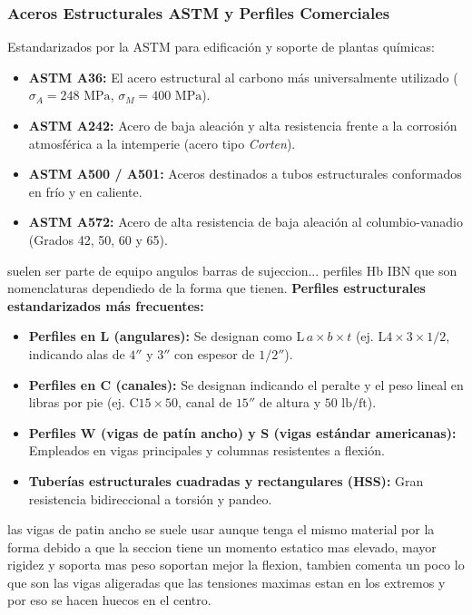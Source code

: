 \subsubsection{Aceros Estructurales ASTM y Perfiles Comerciales}
Estandarizados por la ASTM para edificación y soporte de plantas químicas:
\begin{itemize}
    \item \textbf{ASTM A36:} El acero estructural al carbono más universalmente utilizado ($\sigma_A = 248\text{ MPa}$, $\sigma_M = 400\text{ MPa}$).
    \item \textbf{ASTM A242:} Acero de baja aleación y alta resistencia frente a la corrosión atmosférica a la intemperie (acero tipo \textit{Corten}).
    \item \textbf{ASTM A500 / A501:} Aceros destinados a tubos estructurales conformados en frío y en caliente.
    \item \textbf{ASTM A572:} Acero de alta resistencia de baja aleación al columbio-vanadio (Grados 42, 50, 60 y 65).
\end{itemize}
suelen ser parte de equipo angulos barras de sujeccion...  perfiles Hb IBN que son nomenclaturas dependiedo de la forma que tienen.
\textbf{Perfiles estructurales estandarizados más frecuentes:}
\begin{itemize}
    \item \textbf{Perfiles en L (angulares):} Se designan como $\text{L} \, a \times b \times t$ (ej. $\text{L}4 \times 3 \times 1/2$, indicando alas de $4''$ y $3''$ con espesor de $1/2''$).
    \item \textbf{Perfiles en C (canales):} Se designan indicando el peralte y el peso lineal en libras por pie (ej. $\text{C}15 \times 50$, canal de $15''$ de altura y $50\text{ lb/ft}$).
    \item \textbf{Perfiles W (vigas de patín ancho) y S (vigas estándar americanas):} Empleados en vigas principales y columnas resistentes a flexión.
    \item \textbf{Tuberías estructurales cuadradas y rectangulares (HSS):} Gran resistencia bidireccional a torsión y pandeo.
\end{itemize}
las vigas de patin ancho se suele usar aunque tenga el mismo material por la forma debido a que la seccion tiene un momento estatico mas elevado, mayor rigidez y soporta mas peso soportan mejor la flexion, tambien comenta un poco lo que son las vigas aligeradas que las tensiones maximas estan en los extremos y por eso se hacen huecos en el centro.
